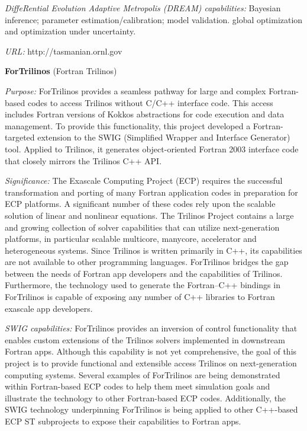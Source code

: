 {\it DiffeRential Evolution Adaptive Metropolis (DREAM) capabilities:}
Bayesian inference; parameter estimation/calibration; model validation.
global optimization and optimization under uncertainty.

{\it URL:} http://tasmanian.ornl.gov


{\bf ForTrilinos} (Fortran Trilinos)

{\it Purpose:}
ForTrilinos provides a seamless pathway for large and complex Fortran-based
codes to access Trilinos without C/C++ interface code. This access includes
Fortran versions of Kokkos abstractions for code execution and data management.
To provide this functionality, this project developed a Fortran-targeted
extension to the SWIG (Simplified Wrapper and Interface Generator) tool.
Applied to Trilinos, it generates object-oriented Fortran 2003 interface code
that closely mirrors the Trilinos C++ API.

{\it Significance:}
The Exascale Computing Project (ECP) requires the successful transformation and
porting of many Fortran application codes in preparation for ECP platforms. A
significant number of these codes rely upon the scalable solution of linear and
nonlinear equations. The Trilinos Project contains a large and growing
collection of solver capabilities that can utilize next-generation platforms, in
particular scalable multicore, manycore, accelerator and heterogeneous systems.
Since Trilinos is written primarily in C++, its capabilities are not available
to other programming languages. ForTrilinos bridges the gap between the
needs of Fortran app developers and the capabilities of Trilinos. Furthermore,
the technology used to generate the Fortran--C++ bindings in ForTrilinos is
capable of exposing any number of C++ libraries to Fortran exascale app
developers.


{\it SWIG capabilities:}
ForTrilinos provides an inversion of control functionality that enables custom
extensions of the Trilinos solvers implemented in downstream Fortran apps.
Although this capability is not yet comprehensive, the goal of this project is
to provide functional and extensible access Trilinos on next-generation
computing systems. Several examples of ForTrilinos are being demonstrated within
Fortran-based ECP codes to help them meet simulation goals and illustrate the
technology to other Fortran-based ECP codes. Additionally, the SWIG technology
underpinning ForTrilinos is being applied to other C++-based ECP ST subprojects
to expose their capabilities to Fortran apps.

